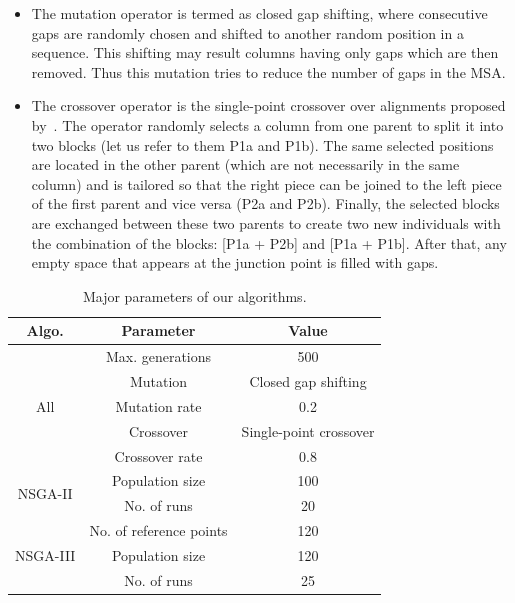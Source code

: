 \begin{itemize}
	
	\item The mutation operator is termed as closed gap shifting, where consecutive gaps are randomly chosen and shifted to another random position in a sequence. This shifting may result columns having only gaps which are then removed. Thus this mutation tries to reduce the number of gaps in the MSA. 
	
	\item The crossover operator is the single-point crossover over alignments proposed by~\citealp{da2010alineaga}. The operator randomly selects a column from one parent to split it into two blocks (let us refer to them P1a and P1b). The same selected positions are located in the other parent (which are not necessarily in the same column) and is tailored so that the right piece can be joined to the left piece of the first parent and vice versa (P2a and P2b). Finally, the selected blocks are exchanged between these two parents to create two new individuals with the combination of the blocks: [P1a + P2b] and [P1a + P1b]. After that, any empty space that appears at the junction point is filled with gaps.
\end{itemize}

\begin{table}[!htbp]
	\centering
	\small
	\caption{Major parameters of our algorithms.}
	\begin{tabular}{|c|c|c|} %
		\hline
		Algo. & \multicolumn{1}{c|}{Parameter} & Value \\
		\hline
		\multirow{5}{*}{All} & Max. generations & 500 \\
		
		\cline{2-3}          & Mutation  & Closed gap shifting \\
		\cline{2-3}          & Mutation rate & 0.2 \\
		\cline{2-3}          & Crossover  & Single-point crossover \\
		\cline{2-3}          & Crossover rate & 0.8 \\ %
		\hline
		\multirow{2}{*}{NSGA-II} & Population size & 100 \\ %
		\cline{2-3}          & No. of runs & 20 \\
		\hline
		\multirow{3}{*}{NSGA-III} & No. of reference points & 120 \\
		\cline{2-3}          & Population size & 120 \\ %
		\cline{2-3}          & No. of runs & 25 \\
		\hline
	\end{tabular}%
	\label{tab:parameters}%
\end{table}%

